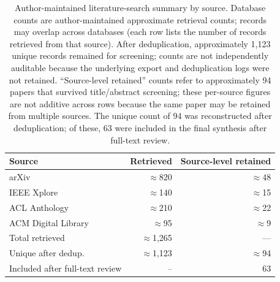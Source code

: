 \documentclass[10pt,twocolumn]{article}
\begin{document}
\begin{table}[!htbp]
\centering
\footnotesize
\renewcommand{\arraystretch}{1.2}
\caption{Author-maintained literature-search summary by source. Database counts are author-maintained approximate retrieval counts; records may overlap across databases (each row lists the number of records retrieved from that source). After deduplication, approximately 1,123 unique records remained for screening; counts are not independently auditable because the underlying export and deduplication logs were not retained. ``Source-level retained'' counts refer to approximately 94 papers that survived title/abstract screening; these per-source figures are not additive across rows because the same paper may be retained from multiple sources. The unique count of 94 was reconstructed after deduplication; of these, 63 were included in the final synthesis after full-text review.}
\label{tab:methodology}
\setlength{\tabcolsep}{4pt}
\begin{tabular}{@{}lrr@{}}
\toprule
Source & Retrieved & Source-level retained \\
\midrule
arXiv & $\approx$820 & $\approx$48 \\
IEEE Xplore & $\approx$140 & $\approx$15 \\
ACL Anthology & $\approx$210 & $\approx$22 \\
ACM Digital Library & $\approx$95 & $\approx$9 \\
\midrule
Total retrieved & $\approx$1{,}265 & --- \\
Unique after dedup. & $\approx$1{,}123 & $\approx$94 \\
Included after full-text review & -- & 63 \\
\bottomrule
\end{tabular}
\end{table}
\end{document}
